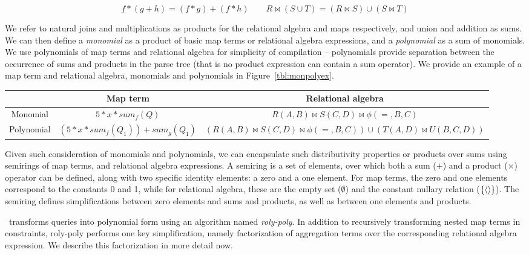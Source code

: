 \[
f*(g+h) = (f*g) + (f*h)
\qquad
R \Join(S \cup T) = (R \Join S) \cup (S \Join T)
\]

We refer to natural joins and multiplications as products for the relational
algebra and maps respectively, and union and addition as sums.  We can then
define a \textit{monomial} as a product of basic map terms or relational algebra
expressions, and a \textit{polynomial} as a sum of monomials. We use polynomials
of map terms and relational algebra for simplicity of compilation -- polynomials
provide separation between the occurrence of sums and products in the parse tree
(that is no product expression can contain a sum operator).
We provide an example of a map term and relational algebra, monomials
and polynomials in Figure~\ref{tbl:monpolyex}.

\begin{figure*}[ht]
\begin{center}
\begin{tabular}{c|c|c}
           & Map term & Relational algebra\\
\hline
Monomial   & $5*x*sum_{f}(Q)$
           & $R(A,B) \Join S(C,D) \Join \phi(=,B,C)$\\
Polynomial & $(5*x*sum_{f}(Q_1)) + sum_g(Q_1) $
           & $(R(A,B) \Join S(C,D) \Join \phi(=,B,C)) \cup (T(A,D) \Join U(B,C,D))$
\end{tabular}
\label{tbl:monpolyex}
\caption{Map term and relational algebra, monomial and polynomial examples.}
\end{center}
\end{figure*}

Given such consideration of monomials and polynomials, we can encapsulate such
distributivity properties or products over sums using semirings of map terms,
and relational algebra expressions. A semiring is a set of elements, over which
both a sum ($+$) and a product ($\times$) operator can be defined, along with two specific
identity elements: a zero and a one element. For map terms, the zero and one
elements correspond to the constants 0 and 1, while for relational algebra,
these are the empty set ($\emptyset$) and the constant nullary relation
($\{{\langle\rangle}\}$). The semiring defines simplifications between zero elements and
sums and products, as well as between one elements and products.

\compiler\ transforms queries into polynomial form using an
algorithm named \textit{roly-poly}. In addition to recursively transforming
nested map terms in constraints, roly-poly performs one key simplification,
namely factorization of aggregation terms over the corresponding relational
algebra expression. We describe this factorization in more detail now.

